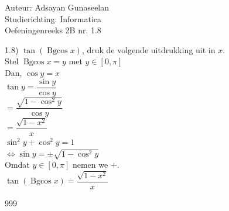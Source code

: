 \documentclass[a4paper]{article}
\newcommand{\bgcos}{\operatorname{Bgcos}}
\begin{document}
\noindent \large Auteur: Adsayan Gunaseelan \\
\noindent \large Studierichting: Informatica\\
\noindent \large Oefeningenreeks 2B nr. 1.8\\

\medskip

\normalsize
1.8) $\tan(\bgcos x)$, druk de volgende uitdrukking uit in $x$.\\

Stel $\bgcos x = y$ met $y \in [0,\pi]$\\

Dan, $\cos y = x$\\

$\tan y = \dfrac{\sin y}{\cos y}$\\

$=\dfrac{\sqrt{1-\cos^2 y}}{\cos y}$\\

$= \dfrac{\sqrt{1-x^2}}{x}$\\

$\sin^2 y + \cos^2 y = 1$\\

$\Leftrightarrow \sin y = \pm \sqrt{1-\cos^2 y}$\\

Omdat $y \in [0,\pi]$ nemen we $+$.\\

$\tan(\bgcos x) = \dfrac{\sqrt{1-x^2}}{x}$\\


\begin{thebibliography}{999}
\end{thebibliography}
\end{document}
